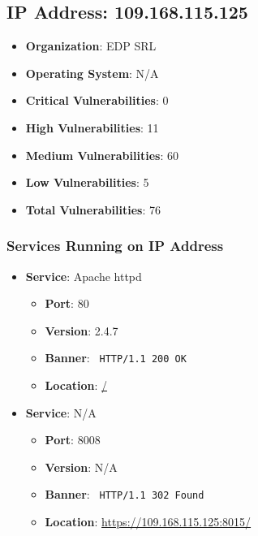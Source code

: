 \documentclass{article}
\begin{document}
\clearpage



\subsection*{IP Address: 109.168.115.125}

\begin{itemize}
    \item \textbf{Organization}: EDP SRL
    \item \textbf{Operating System}:  N/A 
    \item \textbf{Critical Vulnerabilities}: 0
    \item \textbf{High Vulnerabilities}: 11
    \item \textbf{Medium Vulnerabilities}: 60
    \item \textbf{Low Vulnerabilities}: 5
    \item \textbf{Total Vulnerabilities}: 76
\end{itemize}

\subsubsection*{Services Running on IP Address}

\begin{itemize}
    
        \item \textbf{Service}: Apache httpd
        \begin{itemize}
            \item \textbf{Port}: 80
            \item \textbf{Version}:  2.4.7 
            \item \textbf{Banner}: \texttt{ HTTP/1.1 200 OK
 }
            \item \textbf{Location}: \href{ / }{ / }
        \end{itemize}
    
        \item \textbf{Service}: N/A
        \begin{itemize}
            \item \textbf{Port}: 8008
            \item \textbf{Version}:  N/A 
            \item \textbf{Banner}: \texttt{ HTTP/1.1 302 Found
 }
            \item \textbf{Location}: \href{ https://109.168.115.125:8015/ }{ https://109.168.115.125:8015/ }
        \end{itemize}
    
\end{itemize}
\end{document}
